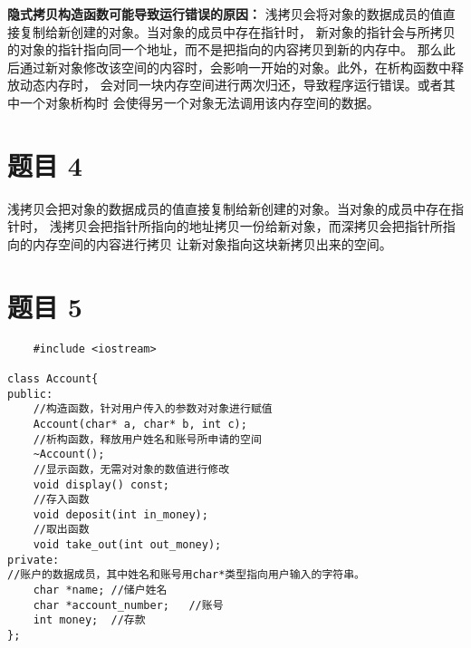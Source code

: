 \documentclass{article}
\begin{document}
\textbf{隐式拷贝构造函数可能导致运行错误的原因：}
浅拷贝会将对象的数据成员的值直接复制给新创建的对象。当对象的成员中存在指针时，
新对象的指针会与所拷贝的对象的指针指向同一个地址，而不是把指向的内容拷贝到新的内存中。
那么此后通过新对象修改该空间的内容时，会影响一开始的对象。此外，在析构函数中释放动态内存时，
会对同一块内存空间进行两次归还，导致程序运行错误。或者其中一个对象析构时
会使得另一个对象无法调用该内存空间的数据。

\section{题目 4}
浅拷贝会把对象的数据成员的值直接复制给新创建的对象。当对象的成员中存在指针时，
浅拷贝会把指针所指向的地址拷贝一份给新对象，而深拷贝会把指针所指向的内存空间的内容进行拷贝
让新对象指向这块新拷贝出来的空间。

\section{题目 5}
\begin{lstlisting}
    #include <iostream>

class Account{
public:
    //构造函数，针对用户传入的参数对对象进行赋值
    Account(char* a, char* b, int c);
    //析构函数，释放用户姓名和账号所申请的空间
    ~Account();
    //显示函数，无需对对象的数值进行修改
    void display() const;    
    //存入函数
    void deposit(int in_money);    
    //取出函数
    void take_out(int out_money);   
private:
//账户的数据成员，其中姓名和账号用char*类型指向用户输入的字符串。
    char *name; //储户姓名
    char *account_number;   //账号
    int money;  //存款
};
\end{lstlisting}
\end{document}

